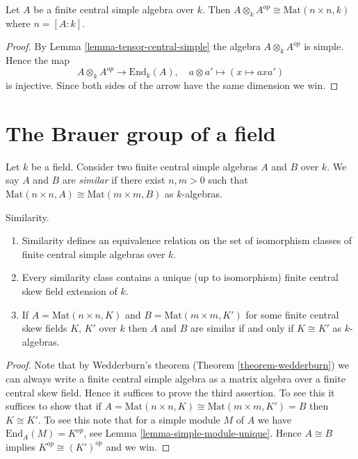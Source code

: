 \begin{lemma}
\label{lemma-inverse}
Let $A$ be a finite central simple algebra over $k$.
Then $A \otimes_k A^{op} \cong \text{Mat}(n \times n, k)$
where $n = [A : k]$.
\end{lemma}

\begin{proof}
By Lemma \ref{lemma-tensor-central-simple} the algebra $A \otimes_k A^{op}$
is simple. Hence the map
$$
A \otimes_k A^{op} \longrightarrow \text{End}_k(A),\quad
a \otimes a' \longmapsto (x \mapsto axa')
$$
is injective. Since both sides of the arrow have the same dimension
we win.
\end{proof}





\section{The Brauer group of a field}
\label{section-brauer}

\noindent
Let $k$ be a field. Consider two finite central simple algebras
$A$ and $B$ over $k$. We say $A$ and $B$ are {\it similar} if there
exist $n, m > 0$ such that
$\text{Mat}(n \times n, A) \cong \text{Mat}(m \times m, B)$
as $k$-algebras.

\begin{lemma}
\label{lemma-similar}
Similarity.
\begin{enumerate}
\item Similarity defines an equivalence relation on the set of isomorphism
classes of finite central simple algebras over $k$.
\item Every similarity class contains a unique (up to isomorphism)
finite central skew field extension of $k$.
\item If $A = \text{Mat}(n \times n, K)$ and $B = \text{Mat}(m \times m, K')$
for some finite central skew fields $K$, $K'$ over $k$
then $A$ and $B$ are similar if and only if $K \cong K'$ as $k$-algebras.
\end{enumerate}
\end{lemma}

\begin{proof}
Note that by Wedderburn's theorem (Theorem \ref{theorem-wedderburn})
we can always write a finite central simple algebra as a matrix
algebra over a finite central skew field. Hence it suffices to prove
the third assertion. To see this it suffices to show that if
$A = \text{Mat}(n \times n, K) \cong \text{Mat}(m \times m, K') = B$
then $K \cong K'$. To see this note that for a simple module $M$ of $A$
we have $\text{End}_A(M) = K^{op}$, see
Lemma \ref{lemma-simple-module-unique}.
Hence $A \cong B$ implies $K^{op} \cong (K')^{op}$ and we win.
\end{proof}

